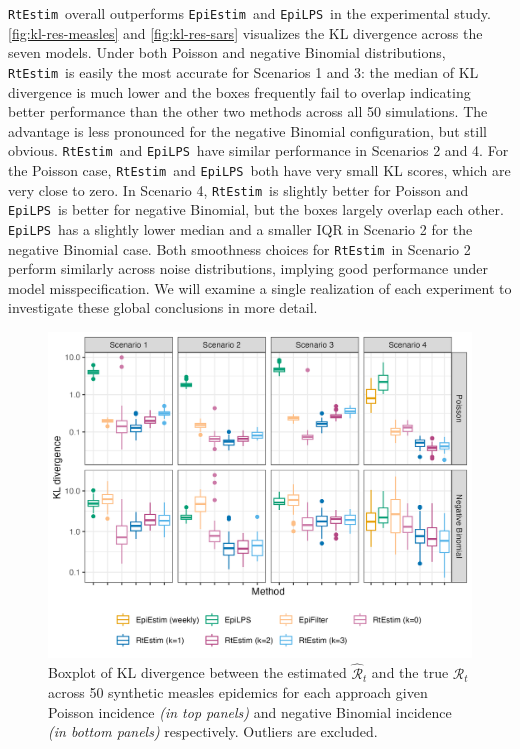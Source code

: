 \documentclass[10pt,letterpaper]{article}
\def\RtEstim{\texttt{RtEstim}}
\def\EpiEstim{\texttt{EpiEstim}}
\def\EpiLPS{\texttt{EpiLPS}}
\def\calR{\mathcal{R}}
\begin{document}
\RtEstim\ overall outperforms \EpiEstim\ and \EpiLPS\ in the experimental study.
\autoref{fig:kl-res-measles} and \autoref{fig:kl-res-sars} visualizes 
the KL divergence across the seven models. Under
both Poisson and negative Binomial distributions, \RtEstim\ is easily the most
accurate for Scenarios 1 and 3: the median of KL divergence is much lower and
the boxes frequently fail to overlap indicating better performance than the
other two methods across all 50 simulations. The advantage is less pronounced
for the negative Binomial configuration, but still obvious.
\RtEstim\ and \EpiLPS\ have similar performance in Scenarios 2 and 4. For the
Poisson case, \RtEstim\ and \EpiLPS\ both have very small KL scores, which are
very close to zero. In Scenario 4, \RtEstim\ is slightly better for Poisson and
\EpiLPS\ is better for negative Binomial, but the boxes largely overlap each
other. \EpiLPS\ has a slightly lower median and a smaller IQR in Scenario 2 for
the negative Binomial case. Both smoothness choices for \RtEstim\ in Scenario 2
perform similarly across noise distributions, implying good performance under 
model misspecification. We will examine a single realization of each
experiment to investigate these global conclusions in more detail.

\begin{figure}[!ht]
  \centering
  \includegraphics[width=.99\textwidth]{fig/fig_kl_week_measles.png}
  \caption{Boxplot of KL divergence between the estimated 
  $\hat{\calR}_t$ and the true $\calR_t$ across 50 synthetic measles epidemics for 
  each approach given Poisson incidence \textit{(in top panels)} and negative 
  Binomial incidence \textit{(in bottom panels)} respectively.  
  Outliers are excluded.} 
  \label{fig:kl-res-measles}
\end{figure}
\end{document}
